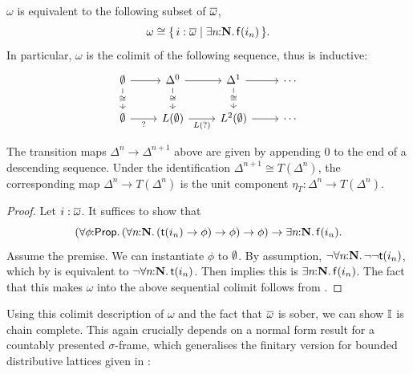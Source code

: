 \begin{proposition}[\AxiomNT, \AxiomSQCC]\label{prop:omegacolimit}
  $\omega$ is equivalent to the following subset of $\overline{\omega}$,
  \[ \omega \cong \scomp{i : \ov\omega}{\ex n{\N} \isf{i_n}}\text{.} \]
  In particular, $\omega$ is the colimit of the following sequence, thus is inductive:
  \[\begin{tikzcd}
    \emp & {\Delta^0} & {\Delta^1} & \cdots \\
    \emp & {L(\emp)} & {L^2(\emp)} & \cdots
    \arrow[from=1-1, to=1-2]
    \arrow["\cong"{description}, from=1-1, to=2-1]
    \arrow[from=1-2, to=1-3]
    \arrow["\cong"{description}, from=1-2, to=2-2]
    \arrow[from=1-3, to=1-4]
    \arrow["\cong"{description}, from=1-3, to=2-3]
    \arrow["{?}"', from=2-1, to=2-2]
    \arrow["{L(?)}"', from=2-2, to=2-3]
    \arrow[from=2-3, to=2-4]
  \end{tikzcd}\]
\end{proposition}

The transition maps $\Delta^n\to \Delta^{n+1}$ above are given by appending $0$ to the end of a descending sequence. Under the identification $\Delta^{n+1}\cong T(\Delta^n)$, the corresponding map $\Delta^n\to T(\Delta^n)$ is the unit component $\eta_T\colon \Delta^n\to T(\Delta^{n})$.

\begin{proof}
  Let $i : \overline{\omega}$. It suffices to show that
  \[ \prth{\fa\phi{\pp} (\fa n{\N} (\ist{i_n} \to \phi) \to \phi) \to \phi} \to \ex{n}\N \isf{i_n}\text{.} \]
  Assume the premise. We can instantiate $\phi$ to $\emptyset$. By assumption, $\neg\forall n\!\colon\!\!\mathbf{N}\mathpunct{.} \neg\neg\mathsf{t}(i_n)$, which by  is equivalent to $\neg\forall n\!\colon\!\!\mathbf{N}\mathpunct{.} \mathsf{t}(i_n)$. Then  implies this is $\exists n\!\colon\!\!\mathbf{N}\mathpunct{.} \mathsf{f}(i_n)$. The fact that this makes $\omega$ into the above sequential colimit follows from \citet[Cor.~1.10]{VANOOSTEN2000233}.
\end{proof}

  

Using this colimit description of $\omega$ and the fact that $\overline{\omega}$ is sober, we can show $\mathbb{I}$ is chain complete. This again crucially depends on a normal form result for a countably presented $\sigma$-frame, which generalises the finitary version for bounded distributive lattices given in :

